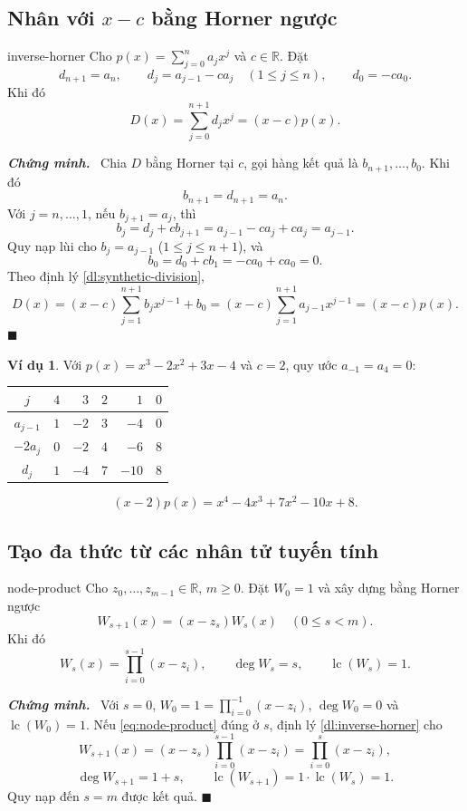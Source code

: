 \documentclass[12pt,a4paper,oneside]{book}
\numberwithin{algorithm}{chapter}
\theoremstyle{definition}
\newtheorem{vidu}{Ví dụ}[chapter]
\newenvironment{chungminh}{\par\medskip\noindent\textbf{\textit{\color{mainblue}Chứng minh.}}\ }{\hfill$\blacksquare$\par\medskip}
\newcommand{\R}{\mathbb{R}}
\newcommand{\lc}{\operatorname{lc}}
\begin{document}
\subsection{Nhân với \texorpdfstring{$x-c$}{x-c} bằng Horner ngược}
\begin{dinhly}{}{inverse-horner}
Cho $p(x)=\sum_{j=0}^{n}a_jx^j$ và $c\in\R$. Đặt
\begin{equation}\label{eq:inverse-horner}
 d_{n+1}=a_n,\qquad
 d_j=a_{j-1}-ca_j\quad(1\leq j\leq n),\qquad d_0=-ca_0.
\end{equation}
Khi đó
\[
 D(x)=\sum_{j=0}^{n+1}d_jx^j=(x-c)p(x).
\]
\end{dinhly}
\begin{chungminh}
Chia $D$ bằng Horner tại $c$, gọi hàng kết quả là $b_{n+1},\ldots,b_0$. Khi đó
\[
 b_{n+1}=d_{n+1}=a_n.
\]
Với $j=n,\ldots,1$, nếu $b_{j+1}=a_j$, thì
\[
 b_j=d_j+cb_{j+1}=a_{j-1}-ca_j+ca_j=a_{j-1}.
\]
Quy nạp lùi cho $b_j=a_{j-1}$ ($1\leq j\leq n+1$), và
\[
 b_0=d_0+cb_1=-ca_0+ca_0=0.
\]
Theo định lý \ref{dl:synthetic-division},
\[
 D(x)=(x-c)\sum_{j=1}^{n+1}b_jx^{j-1}+b_0
 =(x-c)\sum_{j=1}^{n+1}a_{j-1}x^{j-1}=(x-c)p(x).
\]
\end{chungminh}

\begin{vidu}
Với $p(x)=x^3-2x^2+3x-4$ và $c=2$, quy ước $a_{-1}=a_4=0$:
\begin{center}
\begin{tabular}{c|rrrrr}
\toprule
$j$ & $4$ & $3$ & $2$ & $1$ & $0$\\
\midrule
$a_{j-1}$ & $1$ & $-2$ & $3$ & $-4$ & $0$\\
$-2a_j$ & $0$ & $-2$ & $4$ & $-6$ & $8$\\
\midrule
$d_j$ & $\boxed{1}$ & $\boxed{-4}$ & $\boxed{7}$ & $\boxed{-10}$ & $\boxed{8}$\\
\bottomrule
\end{tabular}
\end{center}
\[
 (x-2)p(x)=x^4-4x^3+7x^2-10x+8.
\]
\end{vidu}

\subsection{Tạo đa thức từ các nhân tử tuyến tính}
\begin{menhde}{}{node-product}
Cho $z_0,\ldots,z_{m-1}\in\R$, $m\geq0$. Đặt $W_0=1$ và xây dựng bằng Horner ngược
\[
 W_{s+1}(x)=(x-z_s)W_s(x)\quad(0\leq s<m).
\]
Khi đó
\begin{equation}\label{eq:node-product}
 W_s(x)=\prod_{i=0}^{s-1}(x-z_i),\qquad\deg W_s=s,\qquad\lc(W_s)=1.
\end{equation}
\end{menhde}
\begin{chungminh}
Với $s=0$, $W_0=1=\prod_{i=0}^{-1}(x-z_i)$, $\deg W_0=0$ và $\lc(W_0)=1$. Nếu \eqref{eq:node-product} đúng ở $s$, định lý \ref{dl:inverse-horner} cho
\[
 W_{s+1}(x)=(x-z_s)\prod_{i=0}^{s-1}(x-z_i)
 =\prod_{i=0}^{s}(x-z_i),
\]
\[
 \deg W_{s+1}=1+s,\qquad\lc(W_{s+1})=1\cdot\lc(W_s)=1.
\]
Quy nạp đến $s=m$ được kết quả.
\end{chungminh}
\end{document}
